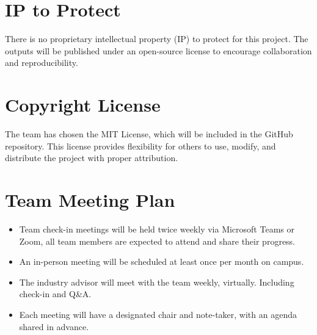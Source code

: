 \documentclass{article}
\begin{document}
\section{IP to Protect}


There is no proprietary intellectual property (IP) to protect for this project. 
The outputs will be published under an open-source license to encourage 
collaboration and reproducibility.

\section{Copyright License}


The team has chosen the MIT License, which will be included in the GitHub 
repository. This license provides flexibility for others to use, modify, 
and distribute the project with proper attribution.


\section{Team Meeting Plan}





\begin{itemize}
  \item Team check-in meetings will be held twice weekly via Microsoft Teams or Zoom, all team members are expected to attend
  and share their progress.
  \item An in-person meeting will be scheduled at least once per month on campus.
  \item The industry advisor will meet with the team weekly, virtually. Including check-in and Q\&A.
  \item Each meeting will have a designated chair and note-taker, with an agenda shared in advance.
\end{itemize}
\end{document}
